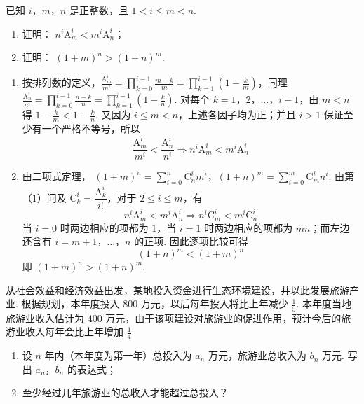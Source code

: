 \begin{problem}
已知 \(i\)，\(m\)，\(n\) 是正整数，且 \(1 < i \leqslant m < n\).

\begin{enumerate}
\item 证明： \(n^i \mathrm A_{m}^{i} < m^i \mathrm A_{n}^{i}\)；
\item 证明： \((1+m)^{n}>(1+n)^{m}\).
\end{enumerate}
\end{problem}

\begin{solution}
\begin{enumerate}
\item 按排列数的定义，\(\displaystyle\frac{\mathrm A_m^i}{m^i}=\prod_{k=0}^{i-1}\frac{m-k}{m}=\prod_{k=1}^{i-1}\left(1-\frac{k}{m}\right)\)，同理 \(\displaystyle\frac{\mathrm A_n^i}{n^i}=\prod_{k=0}^{i-1}\frac{n-k}{n}=\prod_{k=1}^{i-1}\left(1-\frac{k}{n}\right)\). 对每个 \(k=1\)，\(2\)，\(\ldots\)，\(i-1\)，由 \(m<n\) 得 \(1-\frac{k}{m}<1-\frac{k}{n}\). 又因为 \(i\leqslant m<n\)，上述各因子均为正；并且 \(i>1\) 保证至少有一个严格不等号，所以
\[
\frac{\mathrm A_m^i}{m^i}<\frac{\mathrm A_n^i}{n^i}\Longrightarrow n^i\mathrm A_m^i<m^i\mathrm A_n^i
\]
\item 由二项式定理，
\((1+m)^n=\sum_{i=0}^{n}\mathrm C_n^i m^i\)，\((1+n)^m=\sum_{i=0}^{m}\mathrm C_m^i n^i\).
由第（1）问及 \(\mathrm C_k^i=\dfrac{\mathrm A_k^i}{i!}\)，对于 \(2\leqslant i\leqslant m\)，有
\[
n^i\mathrm A_m^i<m^i\mathrm A_n^i
\Longrightarrow
n^i\mathrm C_m^i<m^i\mathrm C_n^i
\]
当 \(i=0\) 时两边相应的项都为 \(1\)，当 \(i=1\) 时两边相应的项都为 \(mn\)；而左边还含有 \(i=m+1\)，\(\ldots\)，\(n\) 的正项. 因此逐项比较可得
\[
(1+n)^m<(1+m)^n
\]
即 \((1+m)^n>(1+n)^m\).
\end{enumerate}
\end{solution}

\begin{problem}
从社会效益和经济效益出发，某地投入资金进行生态环境建设，并以此发展旅游产业. 根据规划，本年度投入 \(800\text{ 万元}\)，以后每年投入将比上年减少 \(\frac{1}{5}\). 本年度当地旅游业收入估计为 \(400\text{ 万元}\)，由于该项建设对旅游业的促进作用，预计今后的旅游业收入每年会比上年增加 \(\frac{1}{4}\).

\begin{enumerate}
\item 设 \(n\) 年内（本年度为第一年）总投入为 \(a_{n}\text{ 万元}\)，旅游业总收入为 \(b_{n}\text{ 万元}\). 写出 \(a_{n}\)，\(b_{n}\) 的表达式；
\item 至少经过几年旅游业的总收入才能超过总投入？
\end{enumerate}
\end{problem}

